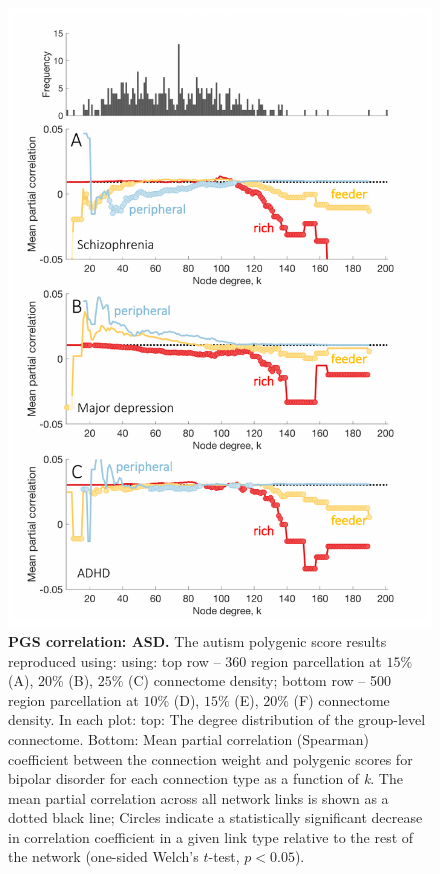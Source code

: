 \begin{figure}[h!]
\begin{center}
\includegraphics[width=1\textwidth]{Chapter5/SFigure6.pdf}%
\end{center}
\caption{\textbf{PGS correlation: ASD.}
The autism polygenic score results reproduced using: using: top row -- 360 region parcellation at $15\%$ (A), $20\%$ (B), $25\%$ (C) connectome density; bottom row -- 500 region parcellation at $10\%$ (D), $15\%$ (E), $20\%$ (F) connectome density. In each plot: top: The degree distribution of the group-level connectome. Bottom: Mean partial correlation (Spearman) coefficient between the connection weight and polygenic scores for bipolar disorder for each connection type as a function of \textit{k}. The mean partial correlation across all network links is shown as a dotted black line; Circles indicate a statistically significant decrease in correlation coefficient in a given link type relative to the rest of the network (one-sided Welch's $t$-test, $p < 0.05$).}
\label{fig:Ch5SFig6}
\end{figure}

